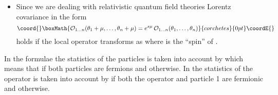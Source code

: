 \documentclass[a4paper,a4paper]{article}
\begin{document}
\begin{itemize}
\item[\myHighlight{$(v)$}\coordHE{}]  Since we are dealing with relativistic quantum field theories
Lorentz covariance in the form 
\[\coord{}\boxMath{
\mathcal{O}_{1\dots n}(\theta _{1}+\mu ,\dots ,\theta _{n}+\mu )=e^{s\mu }\,%
\mathcal{O}_{1\dots n}(\theta _{1},\dots ,\theta _{n}) 
}{corchetes}{0pt}\coordE{}\]
holds if the local operator transforms as \coordHE{} where \coordHE{} is the ``spin'' of \coordHE{}.
\end{itemize}

In the formulae \coordHE{} the statistics of the particles is taken into account
by \coordHE{} which means that \coordHE{} if both particles are
fermions and \coordHE{} otherwise. In \coordHE{} the statistics of
the operator \coordHE{} is taken into account by \coordHE{} if both the operator \coordHE{} and particle 1 are fermionic and \coordHE{} otherwise.
\end{document}
